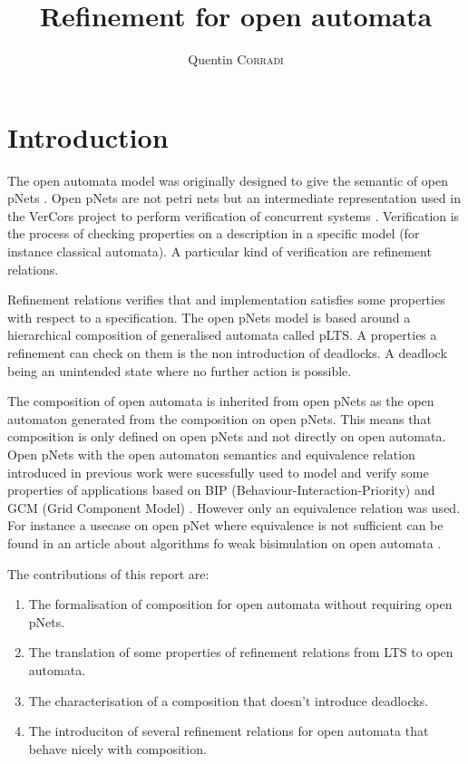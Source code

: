 \documentclass{article}
\title{Refinement for open automata}
\author{Quentin \textsc{Corradi}}
\begin{document}
\maketitle

\section{Introduction}
The open automata model was originally designed to give the semantic of open pNets \cite{2007.10770}.
Open pNets are not petri nets but an intermediate representation used in the VerCors project to perform verification of concurrent systems \cite{henrio:01252323}.
Verification is the process of checking properties on a description in a specific model (for instance classical automata).
A particular kind of verification are refinement relations.

Refinement relations verifies that and implementation satisfies some properties with respect to a specification.
The open pNets model is based around a hierarchical composition of generalised automata called pLTS.
A properties a refinement can check on them is the non introduction of deadlocks.
A deadlock being an unintended state where no further action is possible.

The composition of open automata is inherited from open pNets as the open automaton generated from the composition on open pNets.
This means that composition is only defined on open pNets and not directly on open automata. 
Open pNets with the open automaton semantics and equivalence relation introduced in previous work \cite{2007.10770} were sucessfully used to model and verify some properties of applications \cite{qin:01823507, ameurboulifa:01526055} based on BIP (Behaviour-Interaction-Priority) \cite{basu:hal-00722395} and GCM (Grid Component Model) \cite{baude:inria-00323919}.
However only an equivalence relation was used.
For instance a usecase on open pNet where equivalence is not sufficient can be found in an article about algorithms fo weak bisimulation on open automata \cite{wang:03126313}.

The contributions of this report are:
\begin{enumerate}
\item The formalisation of composition for open automata without requiring open pNets.
\item The translation of some properties of refinement relations from LTS to open automata.
\item The characterisation of a composition that doesn't introduce deadlocks.
\item The introduciton of several refinement relations for open automata that behave nicely with composition.
\end{enumerate}
\end{document}
